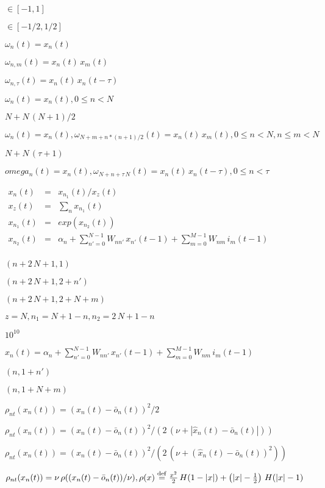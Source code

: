 \documentclass{article}
\begin{document}
$\in[-1,1]$
\pagebreak

$\in[-1/2,1/2]$
\pagebreak

$\omega_n(t) = x_n(t)$
\pagebreak

$\omega_{n,m}(t) = x_n(t) \, x_m(t)$
\pagebreak

$\omega_{n,\tau}(t) = x_n(t) \, x_n(t - \tau)$
\pagebreak

$\omega_n(t) = x_n(t), 0 \leq n < N$
\pagebreak

$N + N \, (N+1) / 2$
\pagebreak

$\omega_n(t) = x_n(t), \omega_{N + m + n * (n+1)/2}(t) = x_n(t) \, x_m(t), 0 \leq n < N, n \leq m < N$
\pagebreak

$N + N \, (\tau + 1)$
\pagebreak

$omega_n(t) = x_n(t), \omega_{N + n+ \tau \, N}(t) = x_n(t) \, x_n(t - \tau), 0 \leq n < \tau$
\pagebreak

$\begin{array}{rcl} x_n(t) &=& x_{n_1}(t) / x_{z}(t)\\ x_{z}(t) &=& \sum_n x_{n_1}(t) \\ x_{n_1}(t) &=& exp(x_{n_2}(t)) \\ x_{n_2}(t) &=& \alpha_n + \sum_{n' = 0}^{N-1} W_{nn'} \, x_{n'}(t-1) + \sum_{m = 0}^{M-1} W_{nm} \, i_m(t-1) \\ \end{array}$
\pagebreak

$(n+2\,N+1,1)$
\pagebreak

$(n+2\,N+1,2+n')$
\pagebreak

$(n+2\,N+1,2+N+m)$
\pagebreak

$z = N, n_1 = N + 1 - n, n_2 = 2 \, N + 1 - n$
\pagebreak

$10^{10}$
\pagebreak

$x_n(t) = \alpha_n + \sum_{n'= 0}^{N-1} W_{nn'} \, x_{n'}(t-1) + \sum_{m=0}^{M-1} W_{nm} \, i_m(t-1)$
\pagebreak

$(n,1+n')$
\pagebreak

$(n,1+N+m)$
\pagebreak

$\rho_{nt}(x_n(t)) = (x_n(t)-\bar{o}_n(t))^2/2$
\pagebreak

$\rho_{nt}(x_n(t)) = (x_n(t)-\bar{o}_n(t))^2/(2 \, (\nu + |\hat{x}_n(t)-\bar{o}_n(t)|))$
\pagebreak

$\rho_{nt}(x_n(t)) = (x_n(t)-\bar{o}_n(t))^2/(2 \, (\nu + (\hat{x}_n(t)-\bar{o}_n(t))^2))$
\pagebreak

$\rho_{nt}(x_n(t)) = \nu \, \rho((x_n(t)-\bar{o}_n(t))/\nu), \rho(x) \stackrel{\rm def}{=} \frac{x^2}{2} \, H(1 - |x|) + \left(|x| - \frac{1}{2}\right) \, H(|x| - 1)$
\pagebreak
\end{document}
